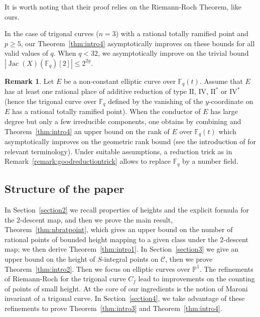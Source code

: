 \documentclass[11pt]{article}
\newcommand{\F}{\ensuremath{\mathbb{F}}}
\theoremstyle{plain}
\theoremstyle{definition}
\newtheorem{remark}[theorem]{Remark}
\DeclareMathOperator{\Jac}{Jac}
\newcommand{\PP}{\mathbb{P}}
\begin{document}
It is worth noting that their proof relies on the Riemann-Roch Theorem, like ours.


In the case of trigonal curves ($n=3$) with a rational totally ramified point and $p\geq 5$, our Theorem~\ref{thm:intro4} asymptotically improves on these bounds for all valid values of $q$. When $q<32$, 
we asymptotically improve on the trivial bound $|\Jac(X)(\mathbb{F}_q)[2]|\leq 2^{2g}$. 


\begin{remark}
Let $E$ be a non-constant elliptic curve over $\F_q(t)$. Assume that $E$ has at least one rational place of additive reduction of type $\mathrm{II}$, $\mathrm{IV}$, $\mathrm{II}^*$ or $\mathrm{IV}^*$ (hence the trigonal curve over $\F_q$ defined by the vanishing of the $y$-coordinate on $E$ has a rational totally ramified point).
When the conductor of $E$ has large degree but only a few irreducible components, one obtains by combining \cite[Theorem~1.1]{gl18a} and Theorem~\ref{thm:intro4}  an upper bound on the rank of $E$ over $\F_q(t)$ which asymptotically improves on the geometric rank bound (see the introduction of \cite{gl18a} for relevant terminology). Under suitable assumptions, a reduction trick as in Remark~\ref{remark:goodreductiontrick} allows to replace $\F_q$ by a number field.
\end{remark}



\subsection*{Structure of the paper}

In Section~\ref{section2} we recall properties of heights and the explicit formula for the $2$-descent map, and then we prove the main result, Theorem~\ref{thm:nbratpoint}, which gives an upper bound on the number of rational points of bounded height mapping to a given class under the $2$-descent map; we then derive Theorem~\ref{thm:intro1}. In Section~\ref{section3} we give an upper bound on the height of $S$-integral points on $\mathcal{C}$, then we prove Theorem~\ref{thm:intro2}. Then we focus on elliptic curves over $\PP^1$. The refinements of Riemann-Roch for the trigonal curve $C_f$ lead to improvements on the counting of points of small height. At the core of our ingredients is the notion of Maroni invariant of a trigonal curve. In Section~\ref{section4}, we take advantage of these refinements to prove Theorem~\ref{thm:intro3} and Theorem~\ref{thm:intro4}.
\end{document}

